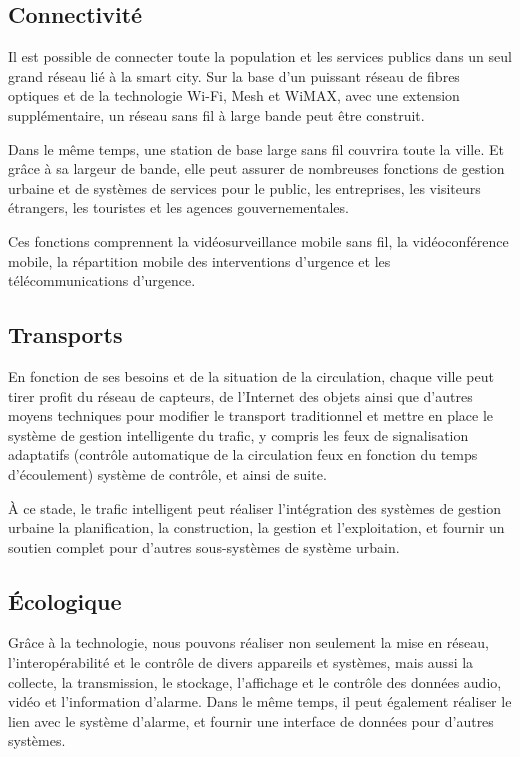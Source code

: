 \subsection{Connectivité}
Il est possible de connecter toute la population et les services publics dans un
seul grand réseau lié à la smart city.
Sur la base d'un puissant réseau de fibres optiques et de la technologie Wi-Fi, Mesh et WiMAX,
avec une extension supplémentaire, un réseau sans fil à large bande peut être construit.

Dans le même temps, une station de base large sans fil couvrira toute la ville.
Et grâce à sa largeur de bande, elle peut assurer de nombreuses fonctions de gestion urbaine
et de systèmes de services pour le public, les entreprises, les visiteurs étrangers,
les touristes et les agences gouvernementales.

Ces fonctions comprennent la vidéosurveillance mobile sans fil, la vidéoconférence mobile,
la répartition mobile des interventions d'urgence et les télécommunications d'urgence.

\subsection{Transports}

En fonction de ses besoins et de la situation de la circulation,
chaque ville peut tirer profit du réseau de capteurs,
de l'Internet des objets ainsi que d'autres moyens techniques pour modifier le transport
traditionnel et mettre en place le système de gestion intelligente du trafic,
y compris les feux de signalisation adaptatifs (contrôle automatique de la circulation
feux en fonction du temps d'écoulement) système de contrôle, et ainsi de suite.

À ce stade, le trafic intelligent peut réaliser l'intégration des systèmes
de gestion urbaine la planification, la construction, la gestion et l'exploitation, et fournir
un soutien complet pour d'autres sous-systèmes de système urbain.

\subsection{Écologique}

Grâce à la technologie, nous pouvons réaliser non seulement la mise en réseau,
l'interopérabilité et le contrôle de divers appareils et systèmes, mais aussi la collecte,
la transmission, le stockage, l'affichage et le contrôle des données audio, vidéo et l'information d'alarme.
Dans le même temps, il peut également réaliser le lien avec le système d'alarme, et fournir
une interface de données pour d'autres systèmes.


